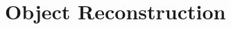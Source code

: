 \graphicspath{{Chapters/Reconstruction/Figures/}}
\chapter{Object Reconstruction}
\label{chap:Reconstruction}
